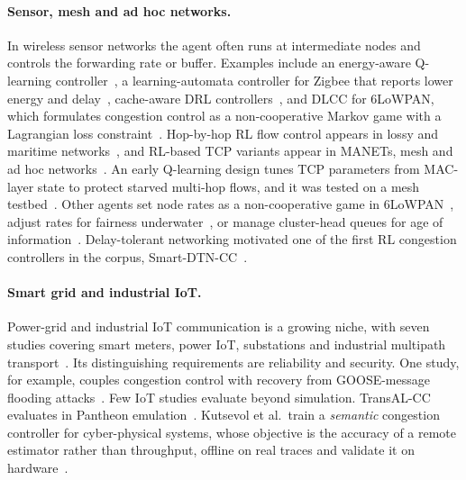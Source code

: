 \paragraph{Sensor, mesh and ad hoc networks.} In wireless sensor networks the agent often runs at intermediate nodes and controls the forwarding rate or buffer. Examples include an energy-aware Q-learning controller~\cite{trinh2018energy}, a learning-automata controller for Zigbee that reports lower energy and delay~\cite{zhou2023congestion}, cache-aware DRL controllers~\cite{alipio2024cache,mishra2026explainable}, and DLCC for 6LoWPAN, which formulates congestion control as a non-cooperative Markov game with a Lagrangian loss constraint~\cite{hou2023deep}. Hop-by-hop RL flow control appears in lossy and maritime networks~\cite{forero2022congestion,forero2023learning}, and RL-based TCP variants appear in MANETs, mesh and ad hoc networks~\cite{molia2023tcp,mahajan2025reinforcement,li2026lightweight,vazaios2026multi,andradezambrano2025performance}. An early Q-learning design tunes TCP parameters from MAC-layer state to protect starved multi-hop flows, and it was tested on a mesh testbed~\cite{arianpoo2016how}. Other agents set node rates as a non-cooperative game in 6LoWPAN~\cite{brik2023adjusting}, adjust rates for fairness underwater~\cite{vijayan2024improved}, or manage cluster-head queues for age of information~\cite{song2024deep}. Delay-tolerant networking motivated one of the first RL congestion controllers in the corpus, Smart-DTN-CC~\cite{silva2019congestion}.

\paragraph{Smart grid and industrial IoT.} Power-grid and industrial IoT communication is a growing niche, with seven studies covering smart meters, power IoT, substations and industrial multipath transport~\cite{andradezambrano2024reinforcement,li2022noninvasive,wang2024research,wang2025transal,lu2026wapi,abedini2026digital,an2026mptcp}. Its distinguishing requirements are reliability and security. One study, for example, couples congestion control with recovery from GOOSE-message flooding attacks~\cite{abedini2026digital}. Few IoT studies evaluate beyond simulation. TransAL-CC evaluates in Pantheon emulation~\cite{wang2025transal}. Kutsevol et al.\ train a \emph{semantic} congestion controller for cyber-physical systems, whose objective is the accuracy of a remote estimator rather than throughput, offline on real traces and validate it on hardware~\cite{kutsevol2025learning}.

